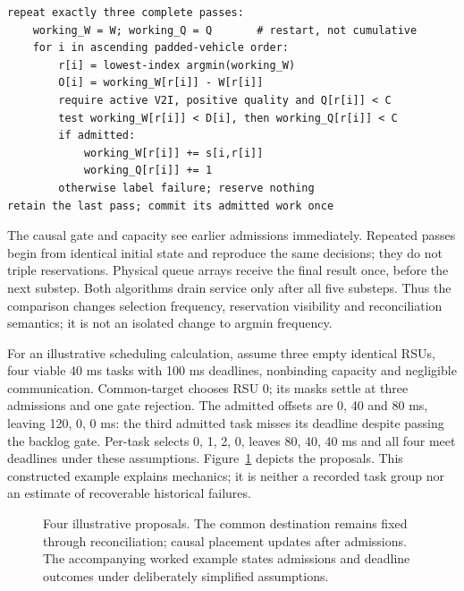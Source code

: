 \documentclass[11pt,a4paper]{article}
\begin{document}
\begin{algorithm}[htbp]
\caption{causal per-task placement with gate (one substep)}\label{alg:2}
\begin{Verbatim}[fontsize=\small,breaklines=true]
repeat exactly three complete passes:
    working_W = W; working_Q = Q       # restart, not cumulative
    for i in ascending padded-vehicle order:
        r[i] = lowest-index argmin(working_W)
        O[i] = working_W[r[i]] - W[r[i]]
        require active V2I, positive quality and Q[r[i]] < C
        test working_W[r[i]] < D[i], then working_Q[r[i]] < C
        if admitted:
            working_W[r[i]] += s[i,r[i]]
            working_Q[r[i]] += 1
        otherwise label failure; reserve nothing
retain the last pass; commit its admitted work once
\end{Verbatim}
\end{algorithm}

The causal gate and capacity see earlier admissions immediately. Repeated passes begin from identical initial state and reproduce the same decisions; they do not triple reservations. Physical queue arrays receive the final result once, before the next substep. Both algorithms drain service only after all five substeps. Thus the comparison changes selection frequency, reservation visibility and reconciliation semantics; it is not an isolated change to argmin frequency.

For an illustrative scheduling calculation, assume three empty identical RSUs, four viable 40 ms tasks with 100 ms deadlines, nonbinding capacity and negligible communication. Common-target chooses RSU 0; its masks settle at three admissions and one gate rejection. The admitted offsets are 0, 40 and 80 ms, leaving 120, 0, 0 ms: the third admitted task misses its deadline despite passing the backlog gate. Per-task selects 0, 1, 2, 0, leaves 80, 40, 40 ms and all four meet deadlines under these assumptions. Figure~\ref{fig:3} depicts the proposals. This constructed example explains mechanics; it is neither a recorded task group nor an estimate of recoverable historical failures.

\begin{figure}[htbp]
\centering

\caption{Four illustrative proposals. The common destination remains fixed through reconciliation; causal placement updates after admissions. The accompanying worked example states admissions and deadline outcomes under deliberately simplified assumptions.}\label{fig:3}
\end{figure}
\end{document}
